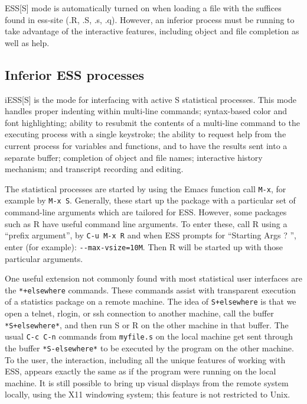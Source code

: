 \documentclass{article}
\begin{document}
ESS[S] mode is automatically turned on when loading a file with the
suffices found in ess-site (.R, .S, .s, .q).  However, an inferior
process must be running to take advantage of the interactive features,
including object and file completion as well as help.

\subsection{Inferior ESS processes}
\label{sec:S:inf}

iESS[S] is the mode for interfacing with active S statistical
processes.  This mode handles proper indenting within multi-line
commands;
syntax-based color and font highlighting; ability to resubmit the
contents of a multi-line command to the executing process with a
single keystroke; the ability to request help from the current process
for variables and functions, and to have the results sent into a
separate buffer; completion of object and file names; interactive
history mechanism; and transcript recording and editing.

The statistical processes are started by using the Emacs function call
\verb+M-x+, for example by \verb|M-x S|. 
Generally, these start up the package with a particular set of
command-line arguments which are tailored for ESS.  However, some
packages such as R have useful command line arguments.  To enter these,
call R using a ``prefix argument'', by \verb+C-u M-x R+ and when ESS
prompts for ``Starting Args ? '', enter (for example):
\verb+--max-vsize=10M+.  Then R will be started up with those particular
arguments.

One useful extension not commonly found with most statistical user
interfaces are the \verb|*+elsewhere| commands.  These commands assist
with transparent execution of a statistics package on a remote machine.
The idea of \verb|S+elsewhere| is that we open a telnet, rlogin, or ssh
connection to another machine, call the buffer \verb|*S+elsewhere*|, and
then run S or R on the other machine in that buffer.  The usual
\texttt{C-c C-n} commands from {\small\texttt{myfile.s}} on the local
machine get sent through the buffer \texttt{*S-elsewhere*} to be
executed by the program on the other machine.  To the user, the
interaction, including all the unique features of working with ESS,
appears exactly the same as if the program were running on the local
machine.  It is still possible to bring up visual displays from the
remote system locally, using the X11 windowing system; this feature is
not restricted to Unix.
\end{document}
